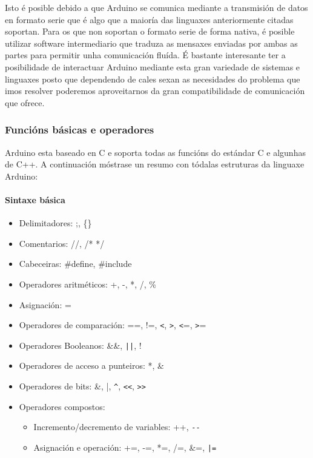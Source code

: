  Isto é posible debido a que Arduino se comunica mediante a transmisión de
 datos en formato serie que é algo que a maioría das linguaxes anteriormente
 citadas soportan. Para os que non soportan o formato serie de forma nativa, é
 posible utilizar software intermediario que traduza as mensaxes enviadas por
 ambas as partes para permitir unha comunicación fluída. É bastante interesante
 ter a posibilidade de interactuar Arduino mediante esta gran variedade de
 sistemas e linguaxes posto que dependendo de cales sexan as necesidades do
 problema que imos resolver poderemos aproveitarnos da gran compatibilidade de
 comunicación que ofrece.

  \subsubsection{Funcións básicas e operadores}

  Arduino esta baseado en C e soporta todas as funcións do estándar C e
  algunhas de C++. A continuación móstrase un resumo con tódalas estruturas da
  linguaxe Arduino:

   \paragraph{Sintaxe básica}

   \begin{itemize}
    \item Delimitadores: ;, \{\}
    \item Comentarios: //, /* */
    \item Cabeceiras: \#define, \#include
    \item Operadores aritméticos: +, -, *, /, \%
    \item Asignación: =
    \item Operadores de comparación: ==, !=, \verb|<|, \verb|>|, \verb|<|=, \verb|>|=
    \item Operadores Booleanos: \&\&, \texttt{||}, !
    \item Operadores de acceso a punteiros: *, \&
    \item Operadores de bits: \&, |, \verb|^|, \verb|<<|, \verb|>>|
    \item Operadores compostos:
          \begin{itemize}
           \item Incremento/decremento de variables: ++, \verb|--|
           \item Asignación e operación: +=, -=, *=, /=, \&=, \texttt{|=}
          \end{itemize}
   \end{itemize}

